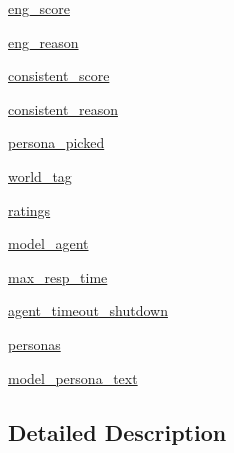 \begin{DoxyCompactItemize}
\hyperlink{classparlai_1_1mturk_1_1tasks_1_1convai2__model__eval_1_1worlds_1_1Convai2EvalWorld_a069989c4c000e3154e03b033ccc353e8}{eng\+\_\+score}
\item 
\hyperlink{classparlai_1_1mturk_1_1tasks_1_1convai2__model__eval_1_1worlds_1_1Convai2EvalWorld_a37863dd765c8d5bb9a5488b19f65ed86}{eng\+\_\+reason}
\item 
\hyperlink{classparlai_1_1mturk_1_1tasks_1_1convai2__model__eval_1_1worlds_1_1Convai2EvalWorld_ae83088f32ac8101e2e6e64a8537b5d68}{consistent\+\_\+score}
\item 
\hyperlink{classparlai_1_1mturk_1_1tasks_1_1convai2__model__eval_1_1worlds_1_1Convai2EvalWorld_a3f2f2c2bfafa200c641474e0567a29f7}{consistent\+\_\+reason}
\item 
\hyperlink{classparlai_1_1mturk_1_1tasks_1_1convai2__model__eval_1_1worlds_1_1Convai2EvalWorld_a747806364239c2320520755980c9166f}{persona\+\_\+picked}
\item 
\hyperlink{classparlai_1_1mturk_1_1tasks_1_1convai2__model__eval_1_1worlds_1_1Convai2EvalWorld_ac3c2c639d22166002b9a8ee1982f3f3f}{world\+\_\+tag}
\item 
\hyperlink{classparlai_1_1mturk_1_1tasks_1_1convai2__model__eval_1_1worlds_1_1Convai2EvalWorld_a2b0bf30c34b162ff3d0c6775dea3d0e3}{ratings}
\item 
\hyperlink{classparlai_1_1mturk_1_1tasks_1_1convai2__model__eval_1_1worlds_1_1Convai2EvalWorld_a0f4af34ac20ed0a5955fda466ddc1083}{model\+\_\+agent}
\item 
\hyperlink{classparlai_1_1mturk_1_1tasks_1_1convai2__model__eval_1_1worlds_1_1Convai2EvalWorld_af6ca258fd4c5f59c8250ade8d1ecd111}{max\+\_\+resp\+\_\+time}
\item 
\hyperlink{classparlai_1_1mturk_1_1tasks_1_1convai2__model__eval_1_1worlds_1_1Convai2EvalWorld_abb5303f4898bce84f4404b677cb02163}{agent\+\_\+timeout\+\_\+shutdown}
\item 
\hyperlink{classparlai_1_1mturk_1_1tasks_1_1convai2__model__eval_1_1worlds_1_1Convai2EvalWorld_aae94215ebc470d0ac5ee523bd65b04e3}{personas}
\item 
\hyperlink{classparlai_1_1mturk_1_1tasks_1_1convai2__model__eval_1_1worlds_1_1Convai2EvalWorld_ab1a1c68b53d1fa51f460b51c76fbee14}{model\+\_\+persona\+\_\+text}
\end{DoxyCompactItemize}


\subsection{Detailed Description}


